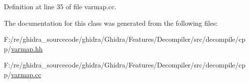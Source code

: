 Definition at line 35 of file varmap.\+cc.



The documentation for this class was generated from the following files\+:\begin{DoxyCompactItemize}
\item 
F\+:/re/ghidra\+\_\+sourcecode/ghidra/\+Ghidra/\+Features/\+Decompiler/src/decompile/cpp/\mbox{\hyperlink{varmap_8hh}{varmap.\+hh}}\item 
F\+:/re/ghidra\+\_\+sourcecode/ghidra/\+Ghidra/\+Features/\+Decompiler/src/decompile/cpp/\mbox{\hyperlink{varmap_8cc}{varmap.\+cc}}\end{DoxyCompactItemize}
